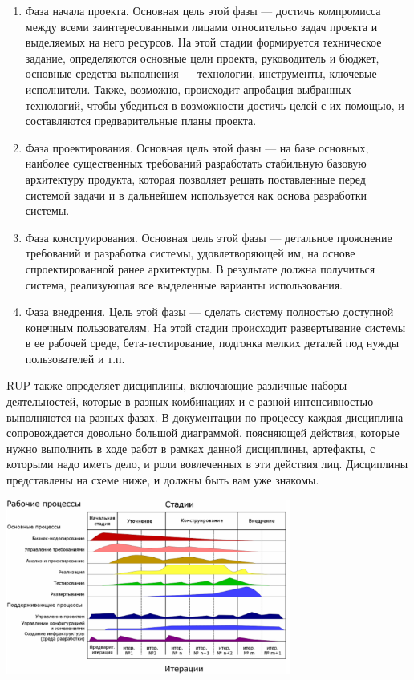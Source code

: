 \documentclass{../../text-style}
\begin{document}
\begin{enumerate}
    \item Фаза начала проекта. Основная цель этой фазы --- достичь компромисса между всеми заинтересованными лицами относительно задач проекта и выделяемых на него ресурсов. На этой стадии формируется техническое задание, определяются основные цели проекта, руководитель и бюджет, основные средства выполнения --- технологии, инструменты, ключевые исполнители. Также, возможно, происходит апробация выбранных технологий, чтобы убедиться в возможности достичь целей с их помощью, и составляются предварительные планы проекта.
    \item Фаза проектирования. Основная цель этой фазы --- на базе основных, наиболее существенных требований разработать стабильную базовую архитектуру продукта, которая позволяет решать поставленные перед системой задачи и в дальнейшем используется как основа разработки системы.
    \item Фаза конструирования. Основная цель этой фазы --- детальное прояснение требований и разработка системы, удовлетворяющей им, на основе спроектированной ранее архитектуры. В результате должна получиться система, реализующая все выделенные варианты использования.
    \item Фаза внедрения. Цель этой фазы --- сделать систему полностью доступной конечным пользователям. На этой стадии происходит развертывание системы в ее рабочей среде, бета-тестирование, подгонка мелких деталей под нужды пользователей и т.п.
\end{enumerate}

RUP также определяет дисциплины, включающие различные наборы деятельностей, которые в разных комбинациях и с разной интенсивностью выполняются на разных фазах. В документации по процессу каждая дисциплина сопровождается довольно большой диаграммой, поясняющей действия, которые нужно выполнить в ходе работ в рамках данной дисциплины, артефакты, с которыми надо иметь дело, и роли вовлеченных в эти действия лиц. Дисциплины представлены на схеме ниже, и должны быть вам уже знакомы. 

\begin{center}
    \includegraphics[width=0.7\textwidth]{rupProcesses.png}
\end{center}
\end{document}
